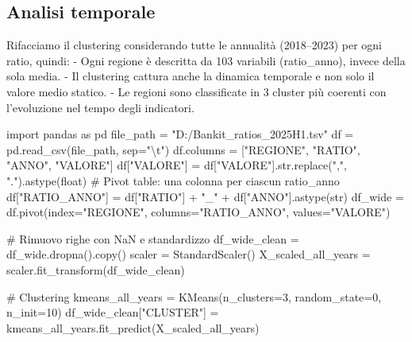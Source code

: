 \documentclass[
  letterpaper,
  DIV=11,
  numbers=noendperiod]{scrartcl}
\newenvironment{Shaded}{\begin{snugshade}}{\end{snugshade}}
\newcommand{\BuiltInTok}[1]{\textcolor[rgb]{0.00,0.23,0.31}{#1}}
\newcommand{\CharTok}[1]{\textcolor[rgb]{0.13,0.47,0.30}{#1}}
\newcommand{\CommentTok}[1]{\textcolor[rgb]{0.37,0.37,0.37}{#1}}
\newcommand{\DecValTok}[1]{\textcolor[rgb]{0.68,0.00,0.00}{#1}}
\newcommand{\ImportTok}[1]{\textcolor[rgb]{0.00,0.46,0.62}{#1}}
\newcommand{\NormalTok}[1]{\textcolor[rgb]{0.00,0.23,0.31}{#1}}
\newcommand{\OperatorTok}[1]{\textcolor[rgb]{0.37,0.37,0.37}{#1}}
\newcommand{\StringTok}[1]{\textcolor[rgb]{0.13,0.47,0.30}{#1}}
\begin{document}
\subsection{Analisi temporale}\label{analisi-temporale}

Rifacciamo il clustering considerando tutte le annualità (2018--2023)
per ogni ratio, quindi: - Ogni regione è descritta da 103 variabili
(ratio\_anno), invece della sola media. - Il clustering cattura anche la
dinamica temporale e non solo il valore medio statico. - Le regioni sono
classificate in 3 cluster più coerenti con l'evoluzione nel tempo degli
indicatori.

\begin{Shaded}
\begin{Highlighting}[]
\ImportTok{import}\NormalTok{ pandas }\ImportTok{as}\NormalTok{ pd}
\NormalTok{file\_path }\OperatorTok{=} \StringTok{"D:/Bankit\_ratios\_2025H1.tsv"}
\NormalTok{df }\OperatorTok{=}\NormalTok{ pd.read\_csv(file\_path, sep}\OperatorTok{=}\StringTok{"}\CharTok{\textbackslash{}t}\StringTok{"}\NormalTok{)}
\NormalTok{df.columns }\OperatorTok{=}\NormalTok{ [}\StringTok{"REGIONE"}\NormalTok{, }\StringTok{"RATIO"}\NormalTok{, }\StringTok{"ANNO"}\NormalTok{, }\StringTok{"VALORE"}\NormalTok{]}
\NormalTok{df[}\StringTok{"VALORE"}\NormalTok{] }\OperatorTok{=}\NormalTok{ df[}\StringTok{"VALORE"}\NormalTok{].}\BuiltInTok{str}\NormalTok{.replace(}\StringTok{","}\NormalTok{, }\StringTok{"."}\NormalTok{).astype(}\BuiltInTok{float}\NormalTok{)}
\CommentTok{\# Pivot table: una colonna per ciascun ratio\_anno}
\NormalTok{df[}\StringTok{"RATIO\_ANNO"}\NormalTok{] }\OperatorTok{=}\NormalTok{ df[}\StringTok{"RATIO"}\NormalTok{] }\OperatorTok{+} \StringTok{"\_"} \OperatorTok{+}\NormalTok{ df[}\StringTok{"ANNO"}\NormalTok{].astype(}\BuiltInTok{str}\NormalTok{)}
\NormalTok{df\_wide }\OperatorTok{=}\NormalTok{ df.pivot(index}\OperatorTok{=}\StringTok{"REGIONE"}\NormalTok{, columns}\OperatorTok{=}\StringTok{"RATIO\_ANNO"}\NormalTok{, values}\OperatorTok{=}\StringTok{"VALORE"}\NormalTok{)}

\CommentTok{\# Rimuovo righe con NaN e standardizzo}
\NormalTok{df\_wide\_clean }\OperatorTok{=}\NormalTok{ df\_wide.dropna().copy()}
\NormalTok{scaler }\OperatorTok{=}\NormalTok{ StandardScaler()}
\NormalTok{X\_scaled\_all\_years }\OperatorTok{=}\NormalTok{ scaler.fit\_transform(df\_wide\_clean)}

\CommentTok{\# Clustering}
\NormalTok{kmeans\_all\_years }\OperatorTok{=}\NormalTok{ KMeans(n\_clusters}\OperatorTok{=}\DecValTok{3}\NormalTok{, random\_state}\OperatorTok{=}\DecValTok{0}\NormalTok{, n\_init}\OperatorTok{=}\DecValTok{10}\NormalTok{)}
\NormalTok{df\_wide\_clean[}\StringTok{"CLUSTER"}\NormalTok{] }\OperatorTok{=}\NormalTok{ kmeans\_all\_years.fit\_predict(X\_scaled\_all\_years)}


\end{Highlighting}
\end{Shaded}
\end{document}
